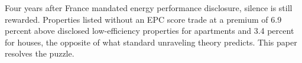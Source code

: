 Four years after France mandated energy performance disclosure, silence is still rewarded. Properties listed without an EPC score trade at a premium of 6.9 percent above disclosed low-efficiency properties for apartments and 3.4 percent for houses, the opposite of what standard unraveling theory predicts. This paper resolves the puzzle.
